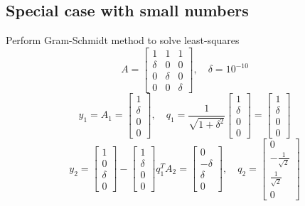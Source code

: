 \documentclass[11pt]{article}
\begin{document}
\subsection{Special case with small numbers}
\begin{example}
    Perform Gram-Schmidt method to solve least-squares
    \[
    A = \begin{bmatrix}
        1 & 1 & 1\\
        \delta & 0 & 0\\
        0 & \delta & 0\\
        0 & 0 & \delta
    \end{bmatrix}, \quad
    \delta = 10^{-10}
    \]
    \[
        y_1 = A_1 = \begin{bmatrix}
            1\\\delta\\0\\0
        \end{bmatrix} ,
        \quad 
        q_1 = \frac{1}{\sqrt{1+\delta^2}}\begin{bmatrix}
            1\\\delta\\0\\0
        \end{bmatrix} = 
        \begin{bmatrix}
            1 \\ \delta \\ 0 \\ 0
        \end{bmatrix}
    \]
    \[
        y_2 = \begin{bmatrix}
            1 \\ 0 \\ \delta \\ 0
        \end{bmatrix}
        - 
        \begin{bmatrix}
            1 \\ \delta \\ 0 \\ 0
        \end{bmatrix} q_1^T A_2
        =
        \begin{bmatrix}
            0\\ -\delta \\ \delta \\ 0
        \end{bmatrix}, \quad
        q_2 = \begin{bmatrix}
            0 \\ - \frac{1}{\sqrt{2}} \\ \frac{1}{\sqrt{2}}\\0

\end{bmatrix}\]
\end{example}
\end{document}
